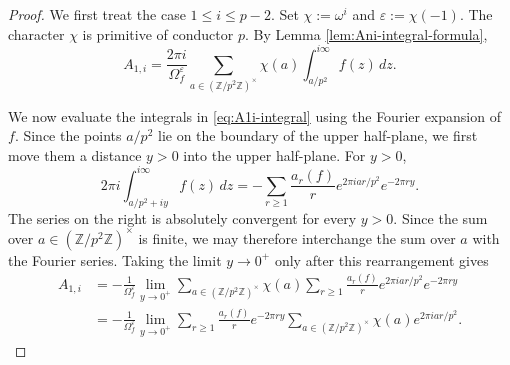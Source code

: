 \documentclass[11pt,table]{amsart}
\newcommand{\Z}{\mathbb{Z}}
\numberwithin{equation}{section}
\begin{document}
\begin{proof}
We first treat the case \(1\leq i\leq p-2\). Set $\chi:=\omega^i$ and $\varepsilon:=\chi(-1)$. The character \(\chi\) is primitive of conductor \(p\). By Lemma \ref{lem:Ani-integral-formula},
\begin{equation}
\label{eq:A1i-integral}
        A_{1,i}
        =
        \frac{2\pi i}{\Omega_f^\varepsilon}
        \sum_{a\in(\Z/p^2\Z)^\times}
        \chi(a)
        \int_{a/p^2}^{i\infty}f(z)\,dz.
\end{equation}

We now evaluate the integrals in \eqref{eq:A1i-integral} using the
Fourier expansion of \(f\).  Since the points \(a/p^2\) lie on the
boundary of the upper half-plane, we first move them a distance
\(y>0\) into the upper half-plane.  For \(y>0\),
\[
        2\pi i
        \int_{a/p^2+iy}^{i\infty}f(z)\,dz
        =
        -\sum_{r\geq1}
        \frac{a_r(f)}{r}
        e^{2\pi i ar/p^2}e^{-2\pi ry}.
\]
The series on the right is absolutely convergent for every \(y>0\).
Since the sum over \(a\in(\Z/p^2\Z)^\times\) is finite, we may
therefore interchange the sum over \(a\) with the Fourier series.
Taking the limit \(y\to0^+\) only after this rearrangement gives
\[
\begin{aligned}
        A_{1,i}
        &=
        -\frac1{\Omega_f^\varepsilon}
        \lim_{y\to0^+}
        \sum_{a\in(\Z/p^2\Z)^\times}
        \chi(a)
        \sum_{r\geq1}
        \frac{a_r(f)}{r}
        e^{2\pi i ar/p^2}e^{-2\pi ry}             \\
        &=
        -\frac1{\Omega_f^\varepsilon}
        \lim_{y\to0^+}
        \sum_{r\geq1}
        \frac{a_r(f)}{r}e^{-2\pi ry}
        \sum_{a\in(\Z/p^2\Z)^\times}
        \chi(a)e^{2\pi i ar/p^2}.
\end{aligned}
\]


\end{proof}
\end{document}
